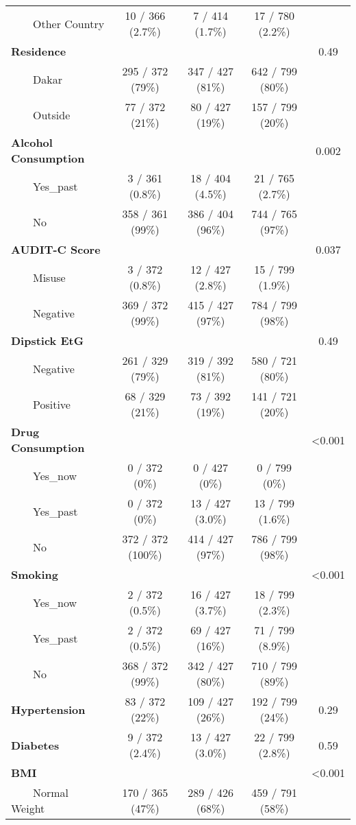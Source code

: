 \documentclass[
]{article}
\begin{document}
\begin{longtable}{lcccc}
    Other Country & 10 / 366 (2.7\%) & 7 / 414 (1.7\%) & 17 / 780 (2.2\%) &  \\ 
\textbf{Residence} &  &  &  & 0.49 \\ 
    Dakar & 295 / 372 (79\%) & 347 / 427 (81\%) & 642 / 799 (80\%) &  \\ 
    Outside & 77 / 372 (21\%) & 80 / 427 (19\%) & 157 / 799 (20\%) &  \\ 
\textbf{Alcohol Consumption} &  &  &  & 0.002 \\ 
    Yes\_past & 3 / 361 (0.8\%) & 18 / 404 (4.5\%) & 21 / 765 (2.7\%) &  \\ 
    No & 358 / 361 (99\%) & 386 / 404 (96\%) & 744 / 765 (97\%) &  \\ 
\textbf{AUDIT-C Score} &  &  &  & 0.037 \\ 
    Misuse & 3 / 372 (0.8\%) & 12 / 427 (2.8\%) & 15 / 799 (1.9\%) &  \\ 
    Negative & 369 / 372 (99\%) & 415 / 427 (97\%) & 784 / 799 (98\%) &  \\ 
\textbf{Dipstick EtG} &  &  &  & 0.49 \\ 
    Negative & 261 / 329 (79\%) & 319 / 392 (81\%) & 580 / 721 (80\%) &  \\ 
    Positive & 68 / 329 (21\%) & 73 / 392 (19\%) & 141 / 721 (20\%) &  \\ 
\textbf{Drug Consumption} &  &  &  & <0.001 \\ 
    Yes\_now & 0 / 372 (0\%) & 0 / 427 (0\%) & 0 / 799 (0\%) &  \\ 
    Yes\_past & 0 / 372 (0\%) & 13 / 427 (3.0\%) & 13 / 799 (1.6\%) &  \\ 
    No & 372 / 372 (100\%) & 414 / 427 (97\%) & 786 / 799 (98\%) &  \\ 
\textbf{Smoking} &  &  &  & <0.001 \\ 
    Yes\_now & 2 / 372 (0.5\%) & 16 / 427 (3.7\%) & 18 / 799 (2.3\%) &  \\ 
    Yes\_past & 2 / 372 (0.5\%) & 69 / 427 (16\%) & 71 / 799 (8.9\%) &  \\ 
    No & 368 / 372 (99\%) & 342 / 427 (80\%) & 710 / 799 (89\%) &  \\ 
\textbf{Hypertension} & 83 / 372 (22\%) & 109 / 427 (26\%) & 192 / 799 (24\%) & 0.29 \\ 
\textbf{Diabetes} & 9 / 372 (2.4\%) & 13 / 427 (3.0\%) & 22 / 799 (2.8\%) & 0.59 \\ 
\textbf{BMI} &  &  &  & <0.001 \\ 
    Normal Weight & 170 / 365 (47\%) & 289 / 426 (68\%) & 459 / 791 (58\%) &  \\ 

\end{longtable}
\end{document}

